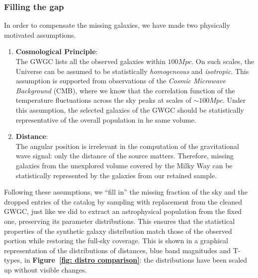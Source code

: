 \subsubsection{Filling the gap}
In order to compensate the missing galaxies, we have made two physically motivated assumptions.
\begin{enumerate}
    \item \textbf{Cosmological Principle}:\\
    The GWGC lists all the observed galaxies within $100Mpc$.
    On such scales, the Universe can be assumed to be statistically \textit{homogeneous} and \textit{isotropic}. 
    This assumption is supported from observations of the \textit{Cosmic Microwave Background} (CMB), where we know that the correlation function of the temperature fluctuations across the sky peaks at scales of $\sim100Mpc$. 
    Under this assumption, the selected galaxies of the GWGC should be statistically representative of the overall population in he same volume.
    \item \textbf{Distance}:\\ 
    The angular position is irrelevant in the computation of the gravitational wave signal: only the distance of the source matters.
    Therefore, missing galaxies from the unexplored volume covered by the Milky Way can be statistically represented by the galaxies from our retained sample.
\end{enumerate}
Following these assumptions, we “fill in” the missing fraction of the sky and the dropped entries of the catalog by sampling with replacement from the cleaned GWGC, just like we did to extract an astrophysical population from the fixed one, preserving its parameter distributions.
This ensures that the statistical properties of the synthetic galaxy distribution match those of the observed portion while restoring the full-sky coverage. 
This is shown in a graphical representation of the distributions of distances, blue band magnitudes and T-types, in \textbf{Figure~\ref{fig: distro comparison}}: the distributions have been scaled up without visible changes.
